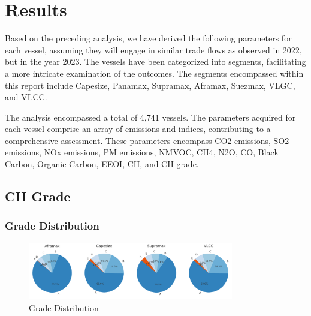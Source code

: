 \chapter{Results}

Based on the preceding analysis, we have derived the following parameters for each vessel, assuming they will engage in similar trade flows as observed in 2022, but in the year 2023. 
The vessels have been categorized into segments, facilitating a more intricate examination of the outcomes. The segments encompassed within this report include Capesize, Panamax, Supramax, Aframax, Suezmax, VLGC, and VLCC.

The analysis encompassed a total of 4,741 vessels. 
The parameters acquired for each vessel comprise an array of emissions and indices, contributing to a comprehensive assessment. 
These parameters encompass CO2 emissions, SO2 emissions, NOx emissions, PM emissions, NMVOC, CH4, N2O, CO, Black Carbon, Organic Carbon, EEOI, CII, and CII grade.


\section{CII Grade}

\subsection*{Grade Distribution}

\begin{figure}[h]
    \centering
    \includegraphics[width=0.8\textwidth]{images/grade_distribution.png}
    \caption{Grade Distribution}
    \label{grade_distribution}
\end{figure}


